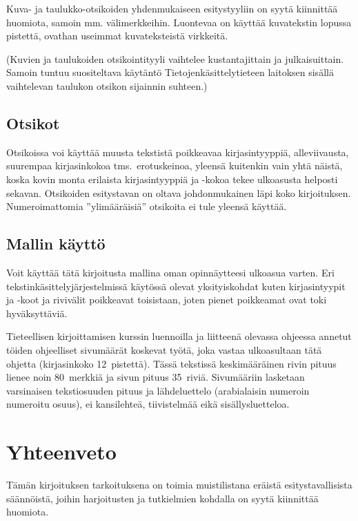 \documentclass[finnish,gradu]{tktltiki}
\begin{document}
Kuva- ja taulukko-otsikoiden yhdenmukaiseen esitystyyliin on syytä kiinnittää
huomiota, samoin mm. välimerkkeihin. Luontevaa on käyttää
kuvatekstin lopussa pistettä, ovathan useimmat kuvateksteistä virkkeitä. 

(Kuvien ja taulukoiden otsikointityyli vaihtelee
kustantajittain ja julkaisuittain. Samoin tuntuu suositeltava käytäntö
Tietojenkäsittelytieteen laitoksen sisällä vaihtelevan taulukon
otsikon sijainnin suhteen.)


\subsection{Otsikot}

Otsikoissa voi käyttää muusta tekstistä poikkeavaa kirjasintyyppiä,
alleviivausta, suurempaa kirjasinkokoa tms.\ erotuskeinoa, yleensä
kuitenkin vain yhtä näistä, koska kovin monta erilaista kirjasintyyppiä
ja -kokoa tekee ulkoasusta helposti sekavan.  Otsikoiden esitystavan on
oltava johdonmukainen läpi koko kirjoituksen. Numeroimattomia
''ylimääräisiä'' otsikoita ei tule yleensä käyttää.


\subsection{Mallin käyttö}

Voit käyttää tätä kirjoitusta mallina oman opinnäytteesi ulkoasua
varten. Eri tekstinkäsittelyjärjestelmissä käytössä olevat yksityiskohdat kuten
kirjasintyypit ja -koot ja rivivälit  poikkeavat toisistaan, joten
pienet poikkeamat ovat toki hyväksyttäviä.

Tieteellisen kirjoittamisen kurssin luennoilla ja
liitteenä olevassa ohjeessa annetut töiden ohjeelliset sivumäärät
koskevat työtä, joka vastaa ulkoasultaan tätä ohjetta (kirjasinkoko
12~pistettä). Tässä tekstissä keskimääräinen rivin pituus lienee noin
80~merkkiä ja sivun pituus 35~riviä.
Sivumääriin lasketaan varsinaisen tekstiosuuden pituus ja lähdeluettelo
(arabialaisin numeroin numeroitu osuus), ei kansilehteä, tiivistelmää
eikä sisällysluetteloa.

\section{Yhteenveto}

Tämän kirjoituksen tarkoituksena on toimia muistilistana eräistä
esitystavallisista säännöistä, joihin harjoitusten ja tutkielmien
kohdalla on syytä kiinnittää huomiota.
\end{document}
